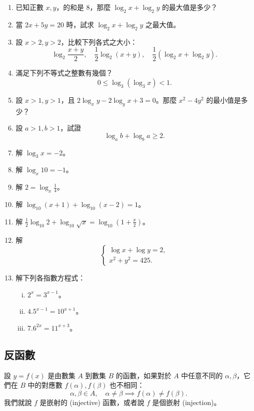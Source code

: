 \begin{enumerate}
    \item 已知正數 $x, y$，的和是 8，那麼 $\log_2 x + \log_2 y$ 的最大值是多少？
    \item 當 $2x+5y=20$ 時，試求 $\log_2 x + \log_2 y$ 之最大值。
    \item 設 $x > 2, y > 2$，比較下列各式之大小：
    \[
    \log_2 \frac{x+y}{2}, \quad \frac{1}{2}\log_2(x+y), \quad \frac{1}{2}(\log_2 x + \log_2 y).
    \]
    \item 滿足下列不等式之整數有幾個？
    \[
    0 \le \log_3(\log_3 x) < 1.
    \]
    \item 設 $x > 1, y > 1$，且 $2\log_x y - 2\log_y x + 3 = 0$。那麼 $x^2 - 4y^2$ 的最小值是多少？
    \item 設 $a > 1, b > 1$，試證
    \[
    \log_a b + \log_b a \ge 2.
    \]
    \item 解 $\log_3 x = -2$。
    \item 解 $\log_x 10 = -1$。
    \item 解 $2 = \log_x \frac{1}{4}$。
    \item 解 $\log_{10}(x+1) + \log_{10}(x-2) = 1$。
    \item 解 $\frac{1}{2}\log_{10} 2 + \log_{10} \sqrt{x} = \log_{10}(1+\frac{x}{2})$。
    \item 解
    \[
    \begin{cases}
    \log x + \log y = 2, \\
    x^2 + y^2 = 425.
    \end{cases}
    \]
    \item 解下列各指數方程式：
    \begin{enumerate}[(i)]
        \item $2^x = 3^{x-1}$。
        \item $4.5^{x-1} = 10^{x+1}$。
        \item $7.6^{2x} = 11^{x+3}$。
    \end{enumerate}
\end{enumerate}

\subsection{反函數}\label{sec:b2_4-4}

設 $y = f(x)$ 是由數集 $A$ 到數集 $B$ 的函數，如果對於 $A$ 中任意不同的 $\alpha, \beta$，它們在 $B$ 中的對應數 $f(\alpha), f(\beta)$ 也不相同：
\[
\alpha, \beta \in A,\quad \alpha \neq \beta \implies f(\alpha) \neq f(\beta).
\]
我們就說 $f$ 是嵌射的 (injective) 函數，或者說 $f$ 是個嵌射 (injection)。

